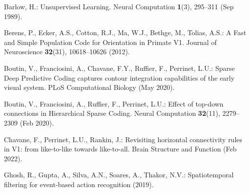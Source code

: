 \documentclass[runningheads]{llncs}
\begin{document}
\begin{thebibliography}{10}
  \providecommand{\url}[1]{\texttt{#1}}
  \providecommand{\urlprefix}{URL }
  \providecommand{\doi}[1]{https://doi.org/#1}
  
  Barlow, H.: Unsupervised {Learning}. Neural Computation  \textbf{1}(3),  295--311 (Sep 1989). %
  
  Berens, P., Ecker, A.S., Cotton, R.J., Ma, W.J., Bethge, M., Tolias, A.S.: A {Fast} and {Simple} {Population} {Code} for {Orientation} in {Primate} {V1}. Journal of Neuroscience  \textbf{32}(31),  10618--10626 (2012). %
  
  Boutin, V., Franciosini, A., Chavane, F.Y., Ruffier, F., Perrinet, L.U.: Sparse {Deep} {Predictive} {Coding} captures contour integration capabilities of the early visual system. PLoS Computational Biology  (May 2020). %
  
  Boutin, V., Franciosini, A., Ruffier, F., Perrinet, L.U.: Effect of top-down connections in {Hierarchical} {Sparse} {Coding}. Neural Computation  \textbf{32}(11),  2279--2309 (Feb 2020). %
  
  Chavane, F., Perrinet, L.U., Rankin, J.: Revisiting horizontal connectivity rules in {V1}: from like-to-like towards like-to-all. Brain Structure and Function  (Feb 2022). %
  
  Ghosh, R., Gupta, A., Silva, A.N., Soares, A., Thakor, N.V.: Spatiotemporal filtering for event-based action recognition (2019). %
  

\end{thebibliography}
\end{document}
